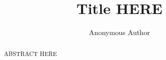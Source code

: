 \documentclass[a4paper,fleqn]{cas-sc}
\begin{document}
\let\WriteBookmarks\relax
\def\floatpagepagefraction{1}
\def\textpagefraction{.001}

\title [mode = title]{Title HERE}

\author{Anonymous Author}

\begin{abstract}
ABSTRACT HERE
\end{abstract}

\begin{keywords}
\end{keywords}

\maketitle



\end{document}
